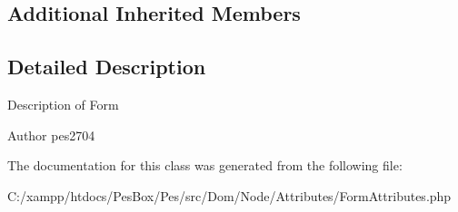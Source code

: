 \subsection*{Additional Inherited Members}


\subsection{Detailed Description}
Description of Form

\begin{DoxyAuthor}{Author}
pes2704 
\end{DoxyAuthor}


The documentation for this class was generated from the following file\+:\begin{DoxyCompactItemize}
\item 
C\+:/xampp/htdocs/\+Pes\+Box/\+Pes/src/\+Dom/\+Node/\+Attributes/Form\+Attributes.\+php\end{DoxyCompactItemize}
